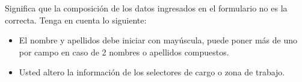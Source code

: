 \begin{itemize}
\begin{figure}[!hbtp]
                         \end{figure}
                         
                            
                            Significa que la composición de los datos ingresados en el formulario no es la correcta. Tenga en cuenta lo siguiente:
                            
                            \begin{itemize}
                                \item El nombre y apellidos debe iniciar con mayúscula, puede poner más de uno por campo en caso de 2 nombres o apellidos compuestos.
                                \item Usted altero la información de los selectores de cargo o zona de trabajo.
                            \end{itemize}
                        
                        
                    
                    \end{itemize}